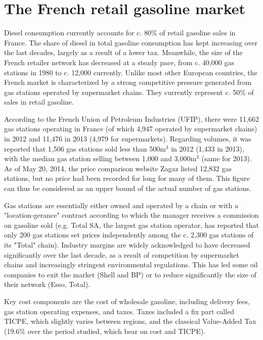 \documentclass[english]{article}
\begin{document}
\section{The French retail gasoline market}

Diesel consumption currently accounts for c. 80\% of retail gasoline sales in France. The share of diesel in total gasoline consumption has kept increasing over the last decades, largely as a result of a lower tax. Meanwhile, the size of the French retailer network has decreased at a steady pace, from c. 40,000 gas stations in 1980 to c. 12,000 currently.  Unlike most other European countries, the French market is characterized by a strong competitive pressure generated from gas stations operated by supermarket chains. They currently represent c. 50\% of sales in retail gasoline.

According to the French Union of Petroleum Industries (UFIP), there were 11,662 gas stations operating in France (of which 4,947 operated by supermarket chains) in 2012 and 11,476 in 2013 (4,979 for supermarkets). Regarding volumes, it was reported that 1,506 gas stations sold less than 500m$^{3}$ in 2012 (1,433 in 2013), with the median gas station selling between 1,000 and 3,000m$^{3}$ (same for 2013). As of May 20, 2014, the price comparison website Zagaz listed 12,832 gas stations, but no price had been recorded for long for many of them. This figure can thus be considered as an upper bound of the actual number of gas stations.

Gas stations are essentially either owned and operated by a chain or with a "location-gerance" contract according to which the manager receives a commission on gasoline sold (e.g. Total SA, the largest gas station operator, has reported that only 200 gas stations set prices independently among the c. 2,300 gas stations of its "Total" chain). Industry margins are widely acknowledged to have decreased significantly over the last decade, as a result of competition by supermarket chains and increasingly stringent environmental regulations. This has led some oil companies to exit the market (Shell and BP) or to reduce significantly the size of their network (Esso, Total).

Key cost components are the cost of wholesale gasoline, including delivery fees,  gas station operating expenses, and taxes. Taxes included a fix part called TICPE, which slightly varies between regions, and the classical Value-Added Tax (19.6\% over the period studied, which bear on cost and TICPE).
\end{document}

